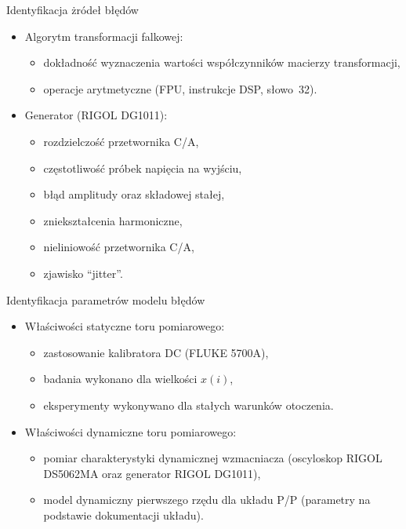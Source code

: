 \documentclass[12pt, polish, aspectratio = 169]{slides}
\begin{document}
\begin{frame}{Identyfikacja żródeł błędów}
\begin{itemize}
\item Algorytm transformacji falkowej:
	\begin{itemize}
	\item dokładność wyznaczenia wartości współczynników macierzy transformacji,
	\item operacje arytmetyczne (FPU, instrukcje DSP, słowo~\qty{32}{\bitOwe}).
	\end{itemize}
\item Generator (RIGOL DG1011):
	\begin{itemize}
	\item rozdzielczość przetwornika C/A,
	\item częstotliwość próbek napięcia na wyjściu,
	\item błąd amplitudy oraz składowej stałej,
	\item zniekształcenia harmoniczne,
	\item nieliniowość przetwornika C/A,
	\item zjawisko \enquote{jitter}.
	\end{itemize}
\end{itemize}
\end{frame}

\begin{frame}{Identyfikacja parametrów modelu błędów}
\begin{itemize}
\item Właściwości statyczne toru pomiarowego:
	\begin{itemize}
	\item zastosowanie kalibratora DC (FLUKE 5700A),
	\item badania wykonano dla wielkości $x(i)$,
	\item eksperymenty wykonywano dla stałych warunków otoczenia.
	\end{itemize}
\item Właściwości dynamiczne toru pomiarowego:
	\begin{itemize}
	\item pomiar charakterystyki dynamicznej wzmacniacza (oscyloskop RIGOL DS5062MA oraz generator RIGOL DG1011),
	\item model dynamiczny pierwszego rzędu dla układu P/P (parametry na podstawie dokumentacji układu).
	\end{itemize}
\end{itemize}
\end{frame}
\end{document}
